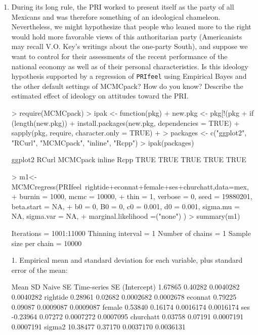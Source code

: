 \documentclass[12pt]{article}
\begin{document}
\begin{enumerate}

\item During its long rule, the PRI worked to present itself as the party of all Mexicans and was therefore something of an ideological chameleon.  Nevertheless, we might hypothesize that people who leaned more to the right would hold more favorable views of this authoritarian party (Americanists may recall V.O. Key's writings about the one-party South), and suppose we want to control for their assessments of the recent performance of the national economy as well as of their personal characteristics.  Is this ideology hypothesis supported by a regression of \texttt{PRIfeel} using Empirical Bayes and the other default settings of MCMCpack?  How do you know?  Describe the estimated effect of ideology on attitudes toward the PRI.  \\

\begin{Schunk}
\begin{Sinput}
> require(MCMCpack)
> ipak <- function(pkg){
+      new.pkg <- pkg[!(pkg %
+      if (length(new.pkg)) 
+          install.packages(new.pkg, dependencies = TRUE)
+      sapply(pkg, require, character.only = TRUE)
+  }
> packages <- c("ggplot2", "RCurl", "MCMCpack", "inline", "Rcpp")
> ipak(packages)
\end{Sinput}
\begin{Soutput}
 ggplot2    RCurl MCMCpack   inline     Rcpp 
    TRUE     TRUE     TRUE     TRUE     TRUE 
\end{Soutput}
\begin{Sinput}
> m1<-MCMCregress(PRIfeel~rightide+econnat+female+ses+churchatt,data=mex,
+     burnin = 1000, mcmc = 10000,
+     thin = 1, verbose = 0, seed = 19880201, beta.start = NA, 
+     b0 = 0, B0 = 0, c0 = 0.001, d0 = 0.001, sigma.mu = NA, sigma.var = NA, 
+     marginal.likelihood =("none") )
> summary(m1)
\end{Sinput}
\begin{Soutput}
Iterations = 1001:11000
Thinning interval = 1 
Number of chains = 1 
Sample size per chain = 10000 

1. Empirical mean and standard deviation for each variable,
   plus standard error of the mean:

                Mean      SD  Naive SE Time-series SE
(Intercept)  1.67865 0.40282 0.0040282      0.0040282
rightide     0.28961 0.02682 0.0002682      0.0002678
econnat      0.79225 0.09087 0.0009087      0.0009087
female       0.53840 0.16174 0.0016174      0.0016174
ses         -0.23964 0.07272 0.0007272      0.0007095
churchatt    0.03758 0.07191 0.0007191      0.0007191
sigma2      10.38477 0.37170 0.0037170      0.0036131


\end{Soutput}
\end{Schunk}
\end{enumerate}
\end{document}
